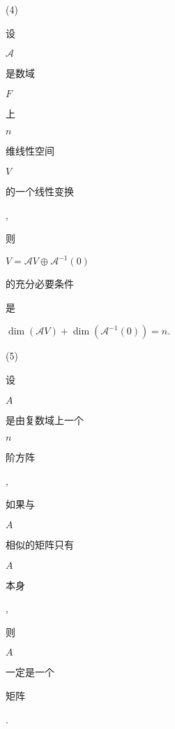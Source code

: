 \documentclass[10pt]{article}
\begin{document}
(4) \begin{CJK}{UTF8}{mj}设\end{CJK} $\mathscr{A}$ \begin{CJK}{UTF8}{mj}是数域\end{CJK} $F$ \begin{CJK}{UTF8}{mj}上\end{CJK} $n$ \begin{CJK}{UTF8}{mj}维线性空间\end{CJK} $V$ \begin{CJK}{UTF8}{mj}的一个线性变换\end{CJK}, \begin{CJK}{UTF8}{mj}则\end{CJK} $V=\mathscr{A} V \oplus \mathscr{A}^{-1}(0)$ \begin{CJK}{UTF8}{mj}的充分必要条件\end{CJK} \begin{CJK}{UTF8}{mj}是\end{CJK} $\operatorname{dim}(\mathscr{A} V)+\operatorname{dim}\left(\mathscr{A}^{-1}(0)\right)=n$.

(5) \begin{CJK}{UTF8}{mj}设\end{CJK} $A$ \begin{CJK}{UTF8}{mj}是由复数域上一个\end{CJK} $n$ \begin{CJK}{UTF8}{mj}阶方阵\end{CJK}, \begin{CJK}{UTF8}{mj}如果与\end{CJK} $A$ \begin{CJK}{UTF8}{mj}相似的矩阵只有\end{CJK} $A$ \begin{CJK}{UTF8}{mj}本身\end{CJK},\begin{CJK}{UTF8}{mj}则\end{CJK} $A$ \begin{CJK}{UTF8}{mj}一定是一个\end{CJK} \begin{CJK}{UTF8}{mj}矩阵\end{CJK}.
\end{document}
